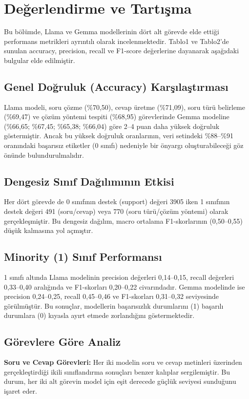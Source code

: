 \documentclass[conference]{IEEEtran}
\begin{document}
\section{Değerlendirme ve Tartışma}
Bu bölümde, Llama ve Gemma modellerinin dört alt görevde elde ettiği performans metrikleri ayrıntılı olarak incelenmektedir. Tablo1 ve Tablo2'de sunulan accuracy, precision, recall ve F1-score değerlerine dayanarak aşağıdaki bulgular elde edilmiştir.

\subsection{Genel Doğruluk (Accuracy) Karşılaştırması}
Llama modeli, soru çözme (\%70,50), cevap üretme (\%71,09), soru türü belirleme (\%69,47) ve çözüm yöntemi tespiti (\%68,95) görevlerinde Gemma modeline (\%66,65; \%67,45; \%65,38; \%66,04) göre 2–4 puan daha yüksek doğruluk göstermiştir. Ancak bu yüksek doğruluk oranlarının, veri setindeki \%88–\%91 oranındaki başarısız etiketler (0 sınıfı) nedeniyle bir önyargı oluşturabileceği göz önünde bulundurulmalıdır.

\subsection{Dengesiz Sınıf Dağılımının Etkisi}
Her dört görevde de 0 sınıfının destek (support) değeri 3905 iken 1 sınıfının destek değeri 491 (soru/cevap) veya 770 (soru türü/çözüm yöntemi) olarak gerçekleşmiştir. Bu dengesiz dağılım, macro ortalama F1-skorlarının (0,50–0,55) düşük kalmasına yol açmıştır.

\subsection{Minority (1) Sınıf Performansı}
1 sınıfı altında Llama modelinin precision değerleri 0,14–0,15, recall değerleri 0,33–0,40 aralığında ve F1-skorları 0,20–0,22 civarındadır. Gemma modelinde ise precision 0,24–0,25, recall 0,45–0,46 ve F1-skorları 0,31–0,32 seviyesinde görülmüştür. Bu sonuçlar, modellerin başarısızlık durumlarını (1) başarılı durumlara (0) kıyasla ayırt etmede zorlandığını göstermektedir.

\subsection{Görevlere Göre Analiz}
\textbf{Soru ve Cevap Görevleri:} Her iki modelin soru ve cevap metinleri üzerinden gerçekleştirdiği ikili sınıflandırma sonuçları benzer kalıplar sergilemiştir. Bu durum, her iki alt görevin model için eşit derecede güçlük seviyesi sunduğunu işaret eder.
\end{document}
